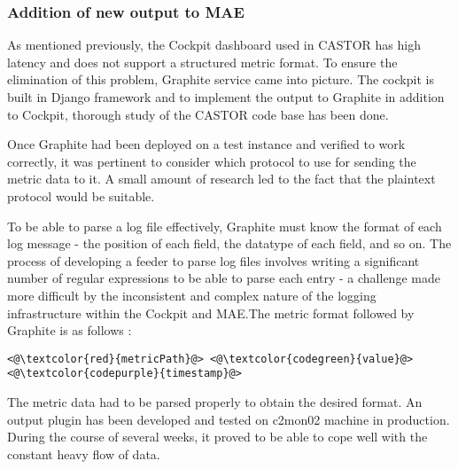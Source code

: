 \documentclass[11pt, letterpaper]{article}            %
\begin{document}
\subsubsection{Addition of new output to MAE}
As mentioned previously, the Cockpit dashboard used in CASTOR has high latency and does not support a structured metric format. To ensure the elimination of this problem, Graphite service came into picture.  The cockpit is built in Django framework and to implement the output to Graphite in addition to Cockpit, thorough study of the CASTOR code base has been done.

Once Graphite had been deployed on a test instance and verified to work correctly, it was pertinent to consider which protocol to use for sending the metric data to it. A small amount of research led to the fact that the plaintext protocol would be suitable.\citep{graphite}

To be able to parse a log file effectively, Graphite must know the format of each log message - the position of each field, the datatype of each field, and so on. The process of developing a feeder to parse log files involves writing a significant number of regular expressions to be able to parse each entry - a challenge made more difficult by the inconsistent and complex nature of the logging infrastructure within the Cockpit and MAE.The metric format followed by Graphite is as follows \citep{mon}:
\linebreak
\begin{lstlisting}[frame=single]
                                <@\textcolor{red}{metricPath}@> <@\textcolor{codegreen}{value}@> <@\textcolor{codepurple}{timestamp}@>
\end{lstlisting}


The metric data had to be parsed properly to obtain the desired format. An output plugin has been developed and tested on c2mon02 machine in production. During the course of several weeks, it proved to be able to cope well with the constant heavy flow of data. 
\end{document}
